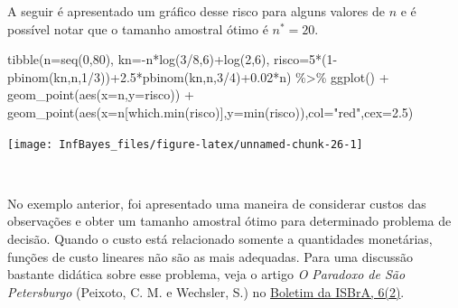 \documentclass[
]{book}
\newenvironment{Shaded}{\begin{snugshade}}{\end{snugshade}}
\newcommand{\AttributeTok}[1]{\textcolor[rgb]{0.77,0.63,0.00}{#1}}
\newcommand{\DecValTok}[1]{\textcolor[rgb]{0.00,0.00,0.81}{#1}}
\newcommand{\FloatTok}[1]{\textcolor[rgb]{0.00,0.00,0.81}{#1}}
\newcommand{\FunctionTok}[1]{\textcolor[rgb]{0.00,0.00,0.00}{#1}}
\newcommand{\NormalTok}[1]{#1}
\newcommand{\SpecialCharTok}[1]{\textcolor[rgb]{0.00,0.00,0.00}{#1}}
\newcommand{\StringTok}[1]{\textcolor[rgb]{0.31,0.60,0.02}{#1}}
\begin{document}
A seguir é apresentado um gráfico desse risco para alguns valores de \(n\) e é possível notar que o tamanho amostral ótimo é \({n}^*=20\).

\begin{Shaded}
\begin{Highlighting}[]
\FunctionTok{tibble}\NormalTok{(}\AttributeTok{n=}\FunctionTok{seq}\NormalTok{(}\DecValTok{0}\NormalTok{,}\DecValTok{80}\NormalTok{),}
       \AttributeTok{kn=}\SpecialCharTok{{-}}\NormalTok{n}\SpecialCharTok{*}\FunctionTok{log}\NormalTok{(}\DecValTok{3}\SpecialCharTok{/}\DecValTok{8}\NormalTok{,}\DecValTok{6}\NormalTok{)}\SpecialCharTok{+}\FunctionTok{log}\NormalTok{(}\DecValTok{2}\NormalTok{,}\DecValTok{6}\NormalTok{),}
       \AttributeTok{risco=}\DecValTok{5}\SpecialCharTok{*}\NormalTok{(}\DecValTok{1}\SpecialCharTok{{-}}\FunctionTok{pbinom}\NormalTok{(kn,n,}\DecValTok{1}\SpecialCharTok{/}\DecValTok{3}\NormalTok{))}\SpecialCharTok{+}\FloatTok{2.5}\SpecialCharTok{*}\FunctionTok{pbinom}\NormalTok{(kn,n,}\DecValTok{3}\SpecialCharTok{/}\DecValTok{4}\NormalTok{)}\SpecialCharTok{+}\FloatTok{0.02}\SpecialCharTok{*}\NormalTok{n) }\SpecialCharTok{\%\textgreater{}\%} 
  \FunctionTok{ggplot}\NormalTok{() }\SpecialCharTok{+}
  \FunctionTok{geom\_point}\NormalTok{(}\FunctionTok{aes}\NormalTok{(}\AttributeTok{x=}\NormalTok{n,}\AttributeTok{y=}\NormalTok{risco)) }\SpecialCharTok{+} 
  \FunctionTok{geom\_point}\NormalTok{(}\FunctionTok{aes}\NormalTok{(}\AttributeTok{x=}\NormalTok{n[}\FunctionTok{which.min}\NormalTok{(risco)],}\AttributeTok{y=}\FunctionTok{min}\NormalTok{(risco)),}\AttributeTok{col=}\StringTok{"red"}\NormalTok{,}\AttributeTok{cex=}\FloatTok{2.5}\NormalTok{)}
\end{Highlighting}
\end{Shaded}

\begin{center}\texttt{[image: InfBayes\_files/figure-latex/unnamed-chunk-26-1]} \end{center}

\(~\)

No exemplo anterior, foi apresentado uma maneira de considerar custos das observações e obter um tamanho amostral ótimo para determinado problema de decisão. Quando o custo está relacionado somente a quantidades monetárias, funções de custo lineares não são as mais adequadas. Para uma discussão bastante didática sobre esse problema, veja o artigo \emph{O Paradoxo de São Petersburgo} (Peixoto, C. M. e Wechsler, S.) no \href{https://www.ime.usp.br/~isbra/boletim/boletim_2013_v06_n02.pdf}{Boletim da ISBrA, 6(2)}.
\end{document}
